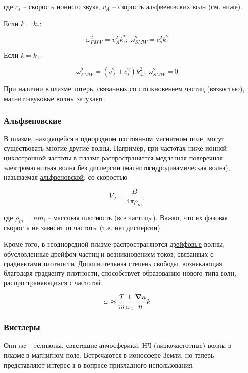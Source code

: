 \documentclass[10pt, a4paper]{article}
\begin{document}
где $c_s$ -- скорость ионного звука, $v_A$ -- скорость альфвеновских волн (см. ниже).

Если $k = k_z$:

\begin{equation*}
	\omega_{FMW}^2 = v_A^2k_z^2;\;\omega_{SMW}^2 = c_s^2k_z^2
\end{equation*}

Если $k = k_\perp$:

\begin{equation*}
	\omega_{FMW}^2 = (v_A^2+c_s^2)k_\perp^2;\;\omega_{SMW}^2 = 0
\end{equation*}

При наличии в плазме потерь, связанных со столкновением частиц (вязкостью), магнитозвуковые волны затухают.

\subsubsection{Альфвеновские}

В плазме, находящейся в однородном постоянном магнитном поле, могут существовать многие другие волны. Например, при частотах ниже ионной циклотронной частоты в плазме распространяется медленная поперечная электромагнитная волна без дисперсии (магнитогидродинамическая волна), называемая \uline{альфвеновской}, со скоростью 

\begin{equation*}
	V_A = \frac{B}{4\pi\rho_m},
\end{equation*}

где $\rho_m$ = $nm_i$ -- массовая плотность (все частицы). Важно, что их фазовая скорость не зависит от частоты (т.е. нет дисперсии).

Кроме того, в неоднородной плазме распространяются \uline{дрейфовые} волны, обусловленные дрейфом частиц и возникновением токов, связанных с  градиентами плотности. Дополнительная степень свободы, возникающая  благодаря градиенту плотности, способствует образованию нового типа волн, распространяющихся с частотой~\cite{kroll} 

\begin{equation*}
	\omega\approx\frac{T}{m}\frac{1}{\omega_c}\frac{\grad{n}}{n}k
\end{equation*}

\subsubsection{Вистлеры}

Они же -- геликоны, свистящие атмосферики. НЧ (низкочастотные) волны в плазме в магнитном поле. Встречаются в ионосфере Земли, но теперь представляют интерес и в вопросе прикладного использования.
\end{document}
